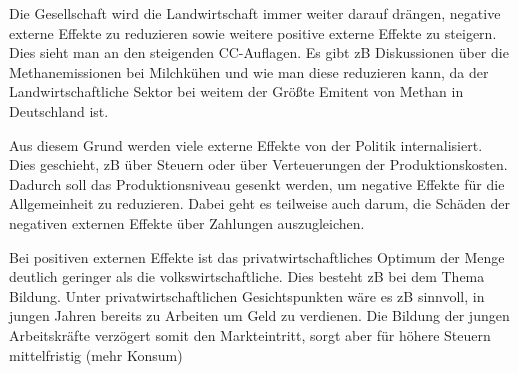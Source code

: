 \documentclass[11pt]{scrbook}
\begin{document}
Die Gesellschaft wird die Landwirtschaft immer weiter darauf drängen, negative externe Effekte zu reduzieren sowie weitere positive externe Effekte zu steigern.
Dies sieht man an den steigenden \ac{CC}-Auflagen.
Es gibt zB Diskussionen über die Methanemissionen bei Milchkühen und wie man diese reduzieren kann, da der Landwirtschaftliche Sektor bei weitem der Größte Emitent von Methan in Deutschland ist.

Aus diesem Grund werden viele externe Effekte von der Politik internalisiert.
Dies geschieht, zB über Steuern oder über Verteuerungen der Produktionskosten.
Dadurch soll das Produktionsniveau gesenkt werden, um negative Effekte für die Allgemeinheit zu reduzieren.
Dabei geht es teilweise auch darum, die Schäden der negativen externen Effekte über Zahlungen auszugleichen.

Bei positiven externen Effekte ist das privatwirtschaftliches Optimum der Menge deutlich geringer als die volkswirtschaftliche.
Dies besteht zB bei dem Thema Bildung.
Unter privatwirtschaftlichen Gesichtspunkten wäre es zB sinnvoll, in jungen Jahren bereits zu Arbeiten um Geld zu verdienen.
Die Bildung der jungen Arbeitskräfte verzögert somit den Markteintritt, sorgt aber für höhere Steuern mittelfristig (mehr Konsum)




\end{document}
